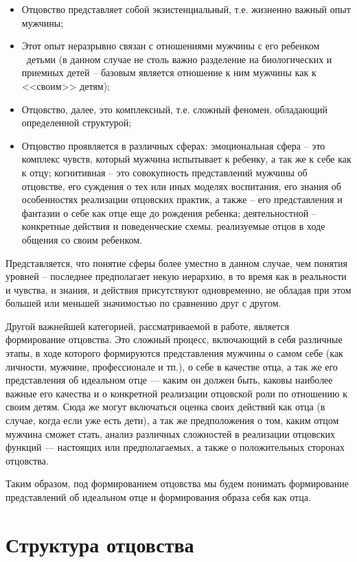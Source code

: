 \documentclass{../../common/thesisbyxetex}
\begin{document}
\begin{itemize}
	\item Отцовство представляет собой экзистенциальный, т.е. жизненно важный опыт
мужчины;
\item Этот опыт неразрывно связан с отношениями мужчины с его ребенком \ детьми (в данном случае не
столь важно разделение на биологических и приемных детей -- базовым является отношение к ним
мужчины как к <<своим>> детям);
\item Отцовство, далее, это комплексный, т.е. сложный феномен, обладающий определенной структурой;
\item Отцовство проявляется в различных сферах: эмоциональная сфера -- это комплекс чувств, который
мужчина испытывает к ребенку, а так же к себе как к отцу; когнитивная -- это совокупность
представлений мужчины об отцовстве, его суждения о тех или иных моделях воспитания, его знания об
особенностях реализации отцовских практик, а также -- его представления и фантазии о себе как отце
еще до рождения ребенка; деятельностной -- конкретные действия и поведенческие схемы. реализуемые
отцов в ходе общения со своим ребенком.

\end{itemize}

Представляется, что понятие сферы более уместно в данном случае, чем понятия уровней -- последнее
предполагает некую иерархию, в то время как в реальности и чувства, и знания, и действия
присутствуют одновременно, не обладая при этом большей или меньшей значимостью по сравнению друг с
другом.

Другой важнейшей категорией, рассматриваемой в работе, является формирование отцовства. Это сложный
процесс, включающий в себя различные этапы, в ходе которого формируются
представления мужчины о самом себе (как личности, мужчине,
профессионале и тп.), о себе в качестве отца, а так же его представления об идеальном отце ---
каким он должен быть, каковы наиболее
важные его качества и о конкретной реализации отцовской роли по отношению к своим детям.
Сюда же могут
включаться оценка своих действий как отца (в случае, когда если уже есть дети), а так же
предположения о том, каким отцом мужчина сможет стать, анализ различных
сложностей в реализации отцовских функций --- настоящих или предполагаемых, а также о положительных
сторонах отцовства.

Таким образом, под формированием отцовства мы будем понимать  формирование представлений об
идеальном отце и формирования образа себя как отца.

\section{Структура отцовства}
\end{document}
